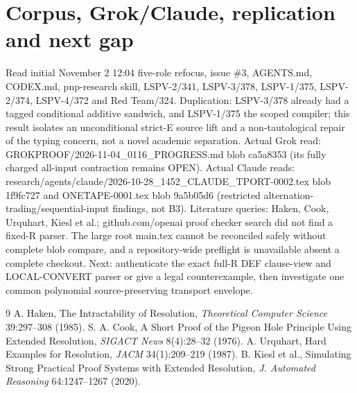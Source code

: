 \documentclass[11pt]{article}
\begin{document}
\section*{Corpus, Grok/Claude, replication and next gap}
Read initial November 2 12:04 five-role refocus, issue \#3, AGENTS.md, CODEX.md, pnp-research skill, LSPV-2/341, LSPV-3/378, LSPV-1/375, LSPV-2/374, LSPV-4/372 and Red Team/324. Duplication: LSPV-3/378 already had a tagged conditional additive sandwich, and LSPV-1/375 the scoped compiler; this result isolates an unconditional strict-E source lift and a non-tautological repair of the typing concern, not a novel academic separation. Actual Grok read: GROKPROOF/2026-11-04\_0116\_PROGRESS.md blob ca5a8353 (its fully charged all-input contraction remains OPEN). Actual Claude reads: research/agents/claude/2026-10-28\_1452\_CLAUDE\_TPORT-0002.tex blob 1f9fc727 and ONETAPE-0001.tex blob 9a5b05d6 (restricted alternation-trading/sequential-input findings, not B3). Literature queries: Haken, Cook, Urquhart, Kiesl et al.; github.com/openai proof checker search did not find a fixed-R parser. The large root main.tex cannot be reconciled safely without complete blob compare, and a repository-wide preflight is unavailable absent a complete checkout. Next: authenticate the exact full-R DEF clause-view and LOCAL-CONVERT parser or give a legal counterexample, then investigate one common polynomial source-preserving transport envelope.

\begin{thebibliography}{9}
 A. Haken, The Intractability of Resolution, \emph{Theoretical Computer Science} 39:297--308 (1985).
 S. A. Cook, A Short Proof of the Pigeon Hole Principle Using Extended Resolution, \emph{SIGACT News} 8(4):28--32 (1976).
 A. Urquhart, Hard Examples for Resolution, \emph{JACM} 34(1):209--219 (1987).
 B. Kiesl et al., Simulating Strong Practical Proof Systems with Extended Resolution, \emph{J. Automated Reasoning} 64:1247--1267 (2020).
\end{thebibliography}
\end{document}
